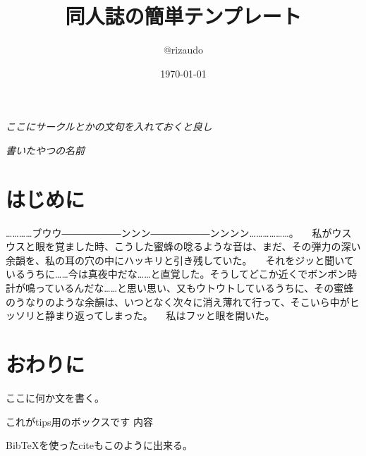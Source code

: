\documentclass[tombo,b5paper]{ltjsarticle}
\author{@rizaudo}
\date{\today}
\title{同人誌の簡単テンプレート}
\begin{document}
\maketitle

\thispagestyle{empty}
\begin{center}
\begin{minipage}{0.85\hsize}
  \begin{large}
    \textit{ここにサークルとかの文句を入れておくと良し}
    \begin{flushright}
      \textit{書いたやつの名前}
    \end{flushright}
  \end{large}
\end{minipage}
\end{center}

\cleardoublepage


\section{はじめに}
…………ブウウ――――――ンンン――――――ンンンン………………。
　私がウスウスと眼を覚ました時、こうした蜜蜂の唸るような音は、まだ、その弾力の深い余韻を、私の耳の穴の中にハッキリと引き残していた。
　それをジッと聞いているうちに……今は真夜中だな……と直覚した。そうしてどこか近くでボンボン時計が鳴っているんだな……と思い思い、又もウトウトしているうちに、その蜜蜂のうなりのような余韻は、いつとなく次々に消え薄れて行って、そこいら中がヒッソリと静まり返ってしまった。
　私はフッと眼を開いた。





\section{おわりに}
ここに何か文を書く。
\begin{tips}{これがtips用のボックスです}
内容
\end{tips}
BibTeXを使ったciteもこのように\cite{Vinyals2015}出来る。
\listoftodos[TODOの一覧が出せるぞ]
\printbibliography[segment=\therefsegment, title=参考文献]
\end{document}
